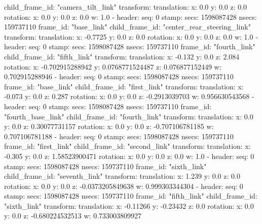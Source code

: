     child_frame_id: "camera_tilt_link"
    transform: 
      translation: 
        x: 0.0
        y: 0.0
        z: 0.0
      rotation: 
        x: 0.0
        y: 0.0
        z: 0.0
        w: 1.0
  - 
    header: 
      seq: 0
      stamp: 
        secs: 1598087428
        nsecs: 159737110
      frame_id: "base_link"
    child_frame_id: "center_rear_steering_link"
    transform: 
      translation: 
        x: -0.7725
        y: 0.0
        z: 0.0
      rotation: 
        x: 0.0
        y: 0.0
        z: 0.0
        w: 1.0
  - 
    header: 
      seq: 0
      stamp: 
        secs: 1598087428
        nsecs: 159737110
      frame_id: "fourth_link"
    child_frame_id: "fifth_link"
    transform: 
      translation: 
        x: -0.132
        y: 0.0
        z: 2.084
      rotation: 
        x: -0.702915288942
        y: 0.0768771524487
        z: 0.076877152449
        w: 0.702915288946
  - 
    header: 
      seq: 0
      stamp: 
        secs: 1598087428
        nsecs: 159737110
      frame_id: "base_link"
    child_frame_id: "first_link"
    transform: 
      translation: 
        x: -0.073
        y: 0.0
        z: 0.287
      rotation: 
        x: 0.0
        y: 0.0
        z: -0.2913039703
        w: 0.956630543568
  - 
    header: 
      seq: 0
      stamp: 
        secs: 1598087428
        nsecs: 159737110
      frame_id: "fourth_base_link"
    child_frame_id: "fourth_link"
    transform: 
      translation: 
        x: 0.0
        y: 0.0
        z: 0.30077731157
      rotation: 
        x: 0.0
        y: 0.0
        z: -0.707106781185
        w: 0.707106781188
  - 
    header: 
      seq: 0
      stamp: 
        secs: 1598087428
        nsecs: 159737110
      frame_id: "first_link"
    child_frame_id: "second_link"
    transform: 
      translation: 
        x: -0.305
        y: 0.0
        z: 1.58523900471
      rotation: 
        x: 0.0
        y: 0.0
        z: 0.0
        w: 1.0
  - 
    header: 
      seq: 0
      stamp: 
        secs: 1598087428
        nsecs: 159737110
      frame_id: "sixth_link"
    child_frame_id: "seventh_link"
    transform: 
      translation: 
        x: 1.239
        y: 0.0
        z: 0.0
      rotation: 
        x: 0.0
        y: 0.0
        z: -0.0373205849638
        w: 0.999303344304
  - 
    header: 
      seq: 0
      stamp: 
        secs: 1598087428
        nsecs: 159737110
      frame_id: "fifth_link"
    child_frame_id: "sixth_link"
    transform: 
      translation: 
        x: -0.11266
        y: -0.23432
        z: 0.0
      rotation: 
        x: 0.0
        y: 0.0
        z: -0.680224532513
        w: 0.733003809927
